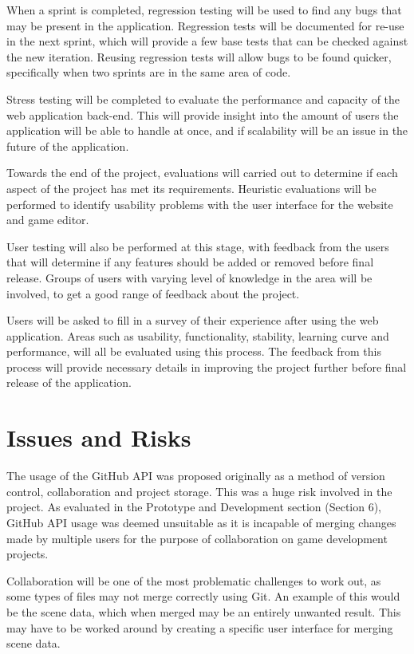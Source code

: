 \documentclass[a4paper, 12pt]{article}
\begin{document}
When a sprint is completed, regression testing will be used to find any bugs that may be present in the application. Regression tests will be documented for re-use in the next sprint, which will provide a few base tests that can be checked against the new iteration. Reusing regression tests will allow bugs to be found quicker, specifically when two sprints are in the same area of code.


Stress testing will be completed to evaluate the performance and capacity of the web application back-end. This will provide insight into the amount of users the application will be able to handle at once, and if scalability will be an issue in the future of the application.

Towards the end of the project, evaluations will carried out to determine if each aspect of the project has met its requirements. Heuristic evaluations will be performed to identify usability problems with the user interface for the website and game editor.

User testing will also be performed at this stage, with feedback from the users that will determine if any features should be added or removed before final release. Groups of users with varying level of knowledge in the area will be involved, to get a good range of feedback about the project.

Users will be asked to fill in a survey of their experience after using the web application. Areas such as usability, functionality, stability, learning curve and performance, will all be evaluated using this process. The feedback from this process will provide necessary details in improving the project further before final release of the application.

\section{Issues and Risks}
The usage of the GitHub API was proposed originally as a method of version control, collaboration and project storage. This was a huge risk involved in the project. As evaluated in the Prototype and Development section (Section 6), GitHub API usage was deemed unsuitable as it is incapable of merging changes made by multiple users for the purpose of collaboration on game development projects.

Collaboration will be one of the most problematic challenges to work out, as some types of files may not merge correctly using Git. An example of this would be the scene data, which when merged may be an entirely unwanted result. This may have to be worked around by creating a specific user interface for merging scene data.
\end{document}
